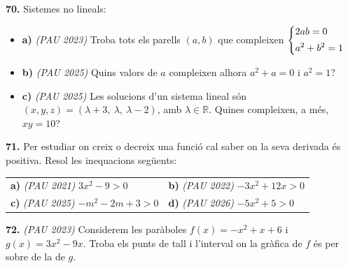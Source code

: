 \documentclass[13pt,a4paper]{extarticle}
\begin{document}
\par\noindent\begin{minipage}{\linewidth}
\textbf{70.} Sistemes no lineals:\par

\begin{itemize}[leftmargin=0pt,itemsep=6pt,topsep=4pt,parsep=0pt,label={}]
\item \textbf{a)} \emph{(PAU 2023)} Troba tots els parells $(a,b)$ que compleixen $\begin{dcases}2ab=0\\[1pt] a^2+b^2=1\end{dcases}$
\item \textbf{b)} \emph{(PAU 2025)} Quins valors de $a$ compleixen alhora $a^2+a=0$ i $a^2=1$?
\item \textbf{c)} \emph{(PAU 2025)} Les solucions d'un sistema lineal són $(x,y,z)=(\lambda+3,\ \lambda,\ \lambda-2)$, amb $\lambda\in\mathbb{R}$. Quines compleixen, a més, $xy=10$?
\end{itemize}
\end{minipage}\par\vspace{1.6mm}
\par\noindent\begin{minipage}{\linewidth}
\textbf{71.} Per estudiar on creix o decreix una funció cal saber on la seva derivada és positiva. Resol les inequacions següents:\par


\begin{tabular}{@{}p{.46\linewidth}p{.46\linewidth}@{}}
\textbf{a)} \emph{(PAU 2021)} $3x^2-9>0$ & \textbf{b)} \emph{(PAU 2022)} $-3x^2+12x>0$ \\[3pt]
\textbf{c)} \emph{(PAU 2025)} $-m^2-2m+3>0$ & \textbf{d)} \emph{(PAU 2026)} $-5x^2+5>0$ \\[3pt]
\end{tabular}\par
\end{minipage}\par\vspace{1.6mm}
\par\noindent\begin{minipage}{\linewidth}
\textbf{72.} \emph{(PAU 2023)} Considerem les paràboles $f(x)=-x^2+x+6$ i $g(x)=3x^2-9x$. Troba els punts de tall i l'interval on la gràfica de $f$ és per sobre de la de $g$.\par
\end{minipage}\par\vspace{1.6mm}
\end{document}
